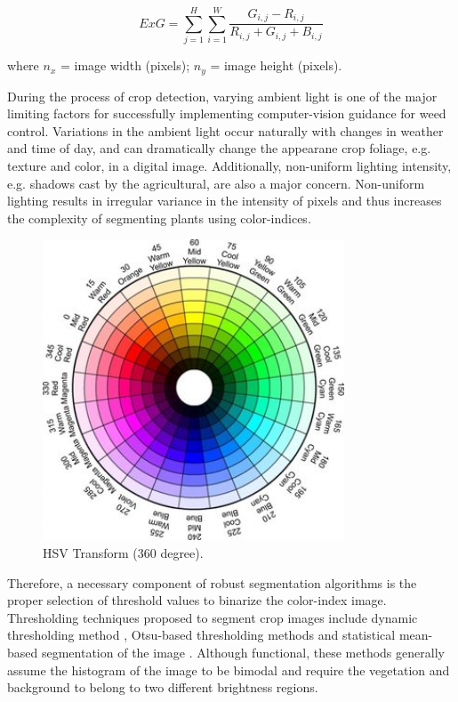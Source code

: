 \documentclass[authoryear]{elsarticle}
\begin{document}
\begin{equation}
    ExG = \displaystyle\sum_{j=1}^{H} \displaystyle\sum_{i=1}^{W}
    \frac{G_{i,j}-R_{i,j}}{R_{i,j} + G_{i,j} + B_{i,j}}
    \label{eq:excess_green}
\end{equation}
\begin{flushleft}
where $n_{x}$ = image width (pixels); $n_{y}$ = image height (pixels).
\end{flushleft}

During the process of crop detection, varying ambient light is one of
the major limiting factors for successfully implementing
computer-vision guidance for weed control. Variations in the ambient
light occur naturally with changes in weather and time of day, and can
dramatically change the appearane crop foliage, e.g. texture and
color, in a digital image. Additionally, non-uniform lighting
intensity, e.g. shadows cast by the agricultural, are also a major
concern. Non-uniform lighting results in irregular variance in the
intensity of pixels and thus increases the complexity of segmenting
plants using color-indices. 

\begin{figure}
  \centering
  \includegraphics[width=0.8\textwidth,natwidth=610,natheight=642]{hsv.jpg}
  \caption{HSV Transform (360 degree).}
  \label{fig:hsv}
\end{figure}

Therefore, a necessary component of robust segmentation algorithms
is the proper selection of threshold values to binarize the
color-index image. Thresholding techniques proposed to 
segment crop images include dynamic thresholding method
\citep{rovira2005}, Otsu-based thresholding methods \citep{meyer2008}
and statistical mean-based segmentation of the image
\citep{guijarro2011}. Although functional, these methods generally
assume the histogram of the image to be bimodal and require the
vegetation and background to belong to two different brightness regions.
\end{document}
